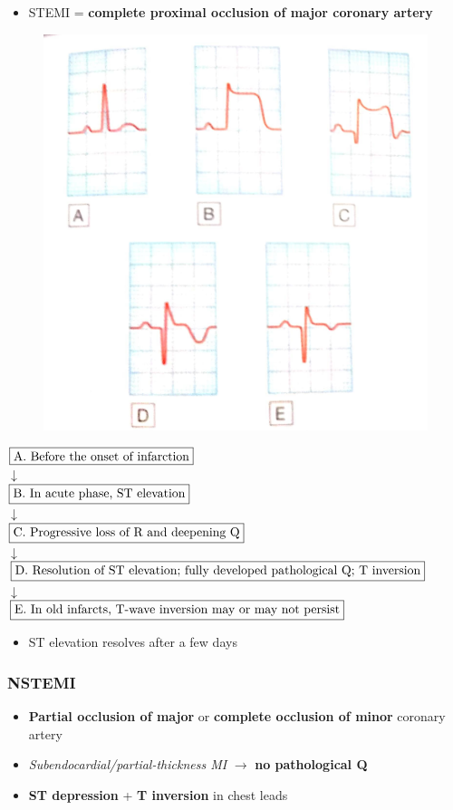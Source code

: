 \documentclass[
  12pt,
]{memoir}
\providecommand{\tightlist}{%
  \setlength{\itemsep}{0pt}\setlength{\parskip}{0pt}}
\begin{document}
\begin{itemize}
\tightlist
\item
  STEMI = \textbf{complete proximal occlusion of major coronary artery}
\end{itemize}

\begin{figure}
\centering
\includegraphics[width=.5\textwidth]{../assets/med/STEMI.jpg}
\end{figure}

\begin{center}
$\fbox{A. Before the onset of infarction}$\\
$\downarrow$\\
$\fbox{B. In acute phase, ST elevation}$\\
$\downarrow$\\
$\fbox{C. Progressive loss of R and deepening Q}$\\
$\downarrow$\\
$\fbox{D. Resolution of ST elevation; fully developed pathological Q;
T inversion}$\\
$\downarrow$\\
$\fbox{E. In old infarcts, T-wave inversion may or may not persist}$\\
\end{center}

\begin{itemize}
\tightlist
\item
  ST elevation resolves after a few days
\end{itemize}

\pagebreak

\hypertarget{nstemi}{%
\subsubsection{NSTEMI}\label{nstemi}}

\begin{itemize}
\tightlist
\item
  \textbf{Partial occlusion of major} or \textbf{complete occlusion of
  minor} coronary artery
\item
  \emph{Subendocardial/partial-thickness MI} \(\rightarrow\) \textbf{no
  pathological Q}
\item
  \textbf{ST depression} + \textbf{T inversion} in chest leads
\end{itemize}
\end{document}
